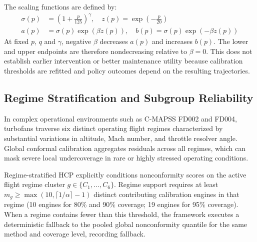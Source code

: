 The scaling functions are defined by:
\begin{align}
\sigma(p) &= \left(1 + \frac{p}{125}\right)^\gamma, \quad z(p) = \exp\left(-\frac{p}{20}\right) \\
a(p) &= \sigma(p)\exp(\beta z(p)), \quad b(p) = \sigma(p)\exp(-\beta z(p))
\end{align}
At fixed $p$, $q$ and $\gamma$, negative $\beta$ decreases $a(p)$ and increases $b(p)$. The lower and upper endpoints are therefore nondecreasing relative to $\beta=0$. This does not establish earlier intervention or better maintenance utility because calibration thresholds are refitted and policy outcomes depend on the resulting trajectories.

\subsection{Regime Stratification and Subgroup Reliability}
In complex operational environments such as C-MAPSS FD002 and FD004, turbofans traverse six distinct operating flight regimes characterized by substantial variations in altitude, Mach number, and throttle resolver angle. Global conformal calibration aggregates residuals across all regimes, which can mask severe local undercoverage in rare or highly stressed operating conditions.

Regime-stratified HCP explicitly conditions nonconformity scores on the active flight regime cluster $g \in \{C_1, \dots, C_6\}$. Regime support requires at least $m_g \ge \max(10, \lceil 1/\alpha \rceil - 1)$ distinct contributing calibration engines in that regime (10 engines for 80\% and 90\% coverage; 19 engines for 95\% coverage). When a regime contains fewer than this threshold, the framework executes a deterministic fallback to the pooled global nonconformity quantile for the same method and coverage level, recording fallback.

